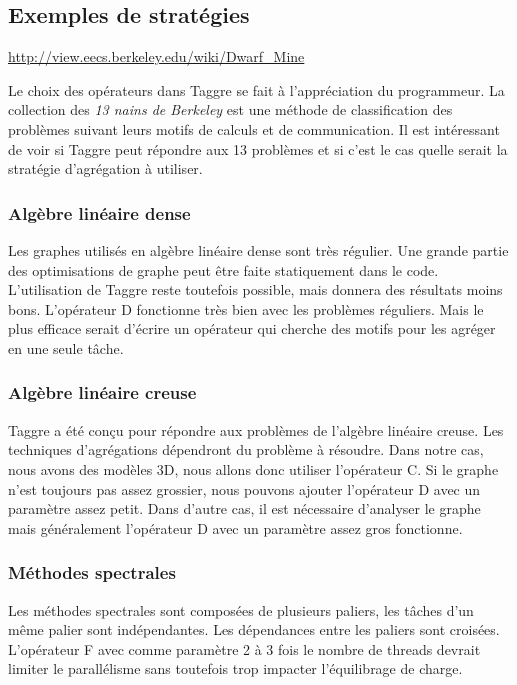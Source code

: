 \subsection{Exemples de stratégies}
\url{http://view.eecs.berkeley.edu/wiki/Dwarf_Mine}

Le choix des opérateurs dans Taggre se fait à l'appréciation du programmeur.
%
La collection des {\em 13 nains de Berkeley} est une méthode de classification des problèmes suivant leurs motifs de calculs et de communication.
%
Il est intéressant de voir si Taggre peut répondre aux 13 problèmes et si c'est le cas quelle serait la stratégie d'agrégation à utiliser.

\subsubsection{Algèbre linéaire dense}
Les graphes utilisés en algèbre linéaire dense sont très régulier.
%
Une grande partie des optimisations de graphe peut être faite statiquement dans le code.
%
L'utilisation de Taggre reste toutefois possible, mais donnera des résultats moins bons.
%
L'opérateur D fonctionne très bien avec les problèmes réguliers.
%
Mais le plus efficace serait d'écrire un opérateur qui cherche des motifs pour les agréger en une seule tâche.


\subsubsection{Algèbre linéaire creuse}
Taggre a été conçu pour répondre aux problèmes de l'algèbre linéaire creuse.
%
Les techniques d'agrégations dépendront du problème à résoudre.
%
Dans notre cas, nous avons des modèles 3D, nous allons donc utiliser l'opérateur C.
%
Si le graphe n'est toujours pas assez grossier, nous pouvons ajouter l'opérateur D avec un paramètre assez petit.
%
Dans d'autre cas, il est nécessaire d'analyser le graphe mais généralement l'opérateur D avec un paramètre assez gros fonctionne.



\subsubsection{Méthodes spectrales}
Les méthodes spectrales sont composées de plusieurs paliers, les tâches d'un même palier sont indépendantes.
%
Les dépendances entre les paliers sont croisées.
%
L'opérateur F avec comme paramètre 2 à 3 fois le nombre de threads devrait limiter le parallélisme sans toutefois trop impacter l'équilibrage de charge.



